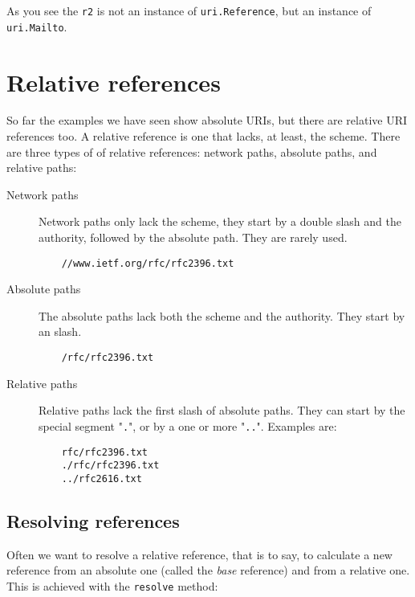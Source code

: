 As you see the {\tt r2} is not an instance of {\tt uri.Reference}, but an
instance of {\tt uri.Mailto}.


\section{Relative references}

So far the examples we have seen show absolute URIs, but there are relative
URI references too. A relative reference is one that lacks, at least, the
scheme. There are three types of of relative references: network paths,
absolute paths, and relative paths:

\begin{description}
  \item [Network paths] Network paths only lack the scheme, they start by a
    double slash and the authority, followed by the absolute path. They are
    rarely used.

\begin{verbatim}
    //www.ietf.org/rfc/rfc2396.txt
\end{verbatim}

  \item [Absolute paths] The absolute paths lack both the scheme and the
     authority. They start by an slash.

\begin{verbatim}
    /rfc/rfc2396.txt
\end{verbatim}

  \item [Relative paths] Relative paths lack the first slash of absolute
    paths. They can start by the special segment "{\tt .}", or by a one or
    more "{\tt ..}". Examples are:

\begin{verbatim}
    rfc/rfc2396.txt
    ./rfc/rfc2396.txt
    ../rfc2616.txt
\end{verbatim}

\end{description}


\subsection{Resolving references}

Often we want to resolve a relative reference, that is to say, to calculate
a new reference from an absolute one (called the {\em base} reference) and
from a relative one. This is achieved with the {\tt resolve} method:

